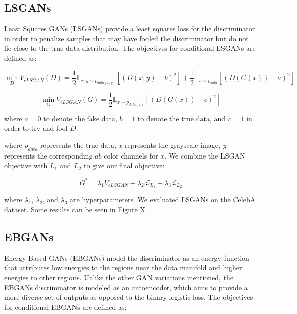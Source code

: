 \documentclass[10pt]{article}
\begin{document}

\subsection{LSGANs}
Least Squares GANs (LSGANs) provide a least squares loss for the discriminator in order to penalize samples
that may have fooled the discriminator but do not lie close to the true data distribution. The objectives
for conditional LSGANs are defined as:

\[\min\limits_{D} V_{cLSGAN}(D) = \frac{1}{2} \mathbb{E}_{x,y \sim p_{data(x,y)}} [(D(x,y)-b) ^2] +
\frac{1}{2} \mathbb{E}_{x \sim p_{data}}[(D(G(x)) - a)^2] \]

\[\min\limits_{G} V_{cLSGAN}(G) = \frac{1}{2} \mathbb{E}_{x \sim p_{data(x)}} [(D(G(x))-c)^2] \]

\noindent where $a=0$ to denote the fake data, $b=1$ to denote the true data, and $c=1$ in order to try and
fool $D$. 

\noindent where $p_{data}$ represents the true data, $x$ represents the grayscale image, $y$ represents
the corresponding $ab$ color channels for $x$. 
We combine the LSGAN objective with $L_1$ and $L_2$ to give our final objective:

\[ G^* = \lambda_1 V_{cLSGAN} + \lambda_2 \mathcal{L}_{L_1} + \lambda_3 \mathcal{L}_{L_2} \]

\noindent where $\lambda_1$, $\lambda_2$, and $\lambda_3$ are hyperparameters. We evaluated LSGANs on
the CelebA dataset. Some results can be seen in Figure X.


\subsection{EBGANs}
Energy-Based GANs (EBGANs) model the discriminator as an energy function that attributes low energies to
the regions near the data manifold and higher energies to other regions. Unlike the other GAN variations
mentioned, the EBGANs discriminator is modeled as an autoencoder, which aims to provide a more diverse
set of outputs as opposed to the binary logistic loss. 
The objectives for conditional EBGANs are defined as:
\end{document}
